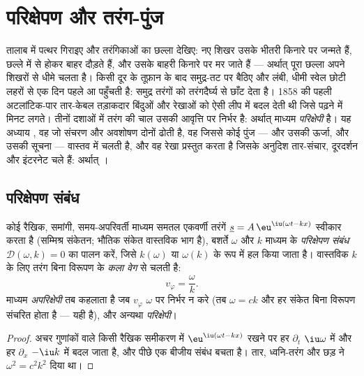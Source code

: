 \chapter{परिक्षेपण और तरंग-पुंज}\label{ch:b2:dispersion-wave-packets}

तालाब में पत्थर गिराइए और तरंगिकाओं का छल्ला देखिए: नए शिखर उसके भीतरी
किनारे पर जन्मते हैं, छल्ले में से होकर बाहर दौड़ते हैं, और उसके बाहरी
किनारे पर मर जाते हैं --- अर्थात् पूरा छल्ला अपने शिखरों से धीमे चलता है।
किसी दूर के तूफ़ान के बाद समुद्र-तट पर बैठिए और लंबी, धीमी स्वेल छोटी
लहरों से एक दिन पहले आ पहुँचती है: समुद्र तरंगों को तरंगदैर्घ्य से छाँट
देता है। 1858 की पहली अटलांटिक-पार तार-केबल तड़ाकदार बिंदुओं और रेखाओं
को ऐसी लीप में बदल देती थी जिसे पढ़ने में मिनट लगते। तीनों दशाओं में
तरंग की चाल उसकी आवृत्ति पर निर्भर है: अर्थात् माध्यम
\emph{परिक्षेपी} है। यह अध्याय , वह
 जो संचरण और अवशोषण दोनों ढोती है, वह 
जिससे कोई पुंज --- और उसकी ऊर्जा, और उसकी सूचना --- वास्तव में चलती है, और
वह रेखा प्रस्तुत करता है जिसके अनुदिश तार-संचार, दूरदर्शन और
इंटरनेट चले हैं: अर्थात् ।

\section{परिक्षेपण संबंध}

\begin{definition}[परिक्षेपण संबंध; कला वेग]\label{def:b2:dispersion-wave-packets:relation}
कोई रैखिक, समांगी, समय-अपरिवर्ती माध्यम समतल
एकवर्णी तरंगें $\underline s = A\,\eu^{\iu(\omega t - kx)}$ स्वीकार करता है (सम्मिश्र
संकेतन; भौतिक संकेत वास्तविक भाग है), बशर्ते $\omega$ और $k$
माध्यम के \emph{परिक्षेपण संबंध} $\mathcal D(\omega, k)
= 0$ का पालन करें, जिसे $k(\omega)$ या $\omega(k)$ के रूप में हल किया जाता है। वास्तविक $k$ के लिए तरंग
बिना विरूपण के \emph{कला वेग} से चलती है:
\[
v_\varphi = \frac\omega k .
\]
माध्यम \emph{अपरिक्षेपी} तब कहलाता है जब $v_\varphi$
$\omega$ पर निर्भर न करे (तब $\omega = ck$ और हर संकेत बिना विरूपण संचरित होता है ---
यही  है), और अन्यथा \emph{परिक्षेपी}।
\end{definition}

\begin{proof}
अचर गुणांकों वाले किसी रैखिक समीकरण में $\eu^{\iu(\omega t - kx)}$ रखने पर
हर $\partial_t$ $\iu\omega$ में और हर $\partial_x$
$-\iu k$ में बदल जाता है, और पीछे एक बीजीय संबंध बचता है। तार, ध्वनि-तरंग और
छड़ ने $\omega^2 = c^2k^2$ दिया था।
\end{proof}

